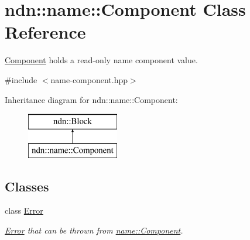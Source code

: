 \hypertarget{classndn_1_1name_1_1Component}{}\section{ndn\+:\+:name\+:\+:Component Class Reference}
\label{classndn_1_1name_1_1Component}


\hyperlink{classndn_1_1name_1_1Component}{Component} holds a read-\/only name component value.  




{\ttfamily \#include $<$name-\/component.\+hpp$>$}

Inheritance diagram for ndn\+:\+:name\+:\+:Component\+:\begin{figure}[H]
\begin{center}
\leavevmode
\includegraphics[height=2.000000cm]{classndn_1_1name_1_1Component}
\end{center}
\end{figure}
\subsection*{Classes}
\begin{DoxyCompactItemize}
\item 
class \hyperlink{classndn_1_1name_1_1Component_1_1Error}{Error}
\begin{DoxyCompactList}\small\item\em \hyperlink{classndn_1_1name_1_1Component_1_1Error}{Error} that can be thrown from \hyperlink{classndn_1_1name_1_1Component}{name\+::\+Component}. \end{DoxyCompactList}\end{DoxyCompactItemize}
